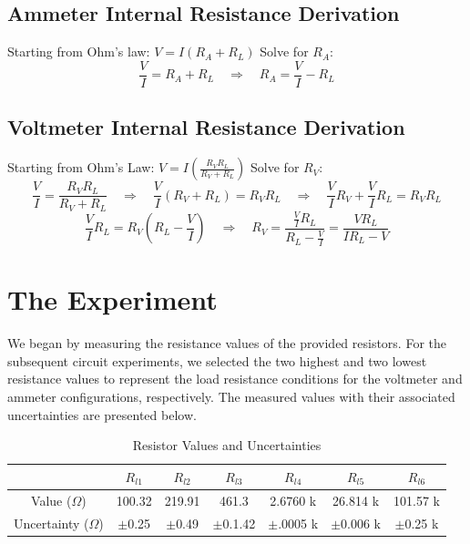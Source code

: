 \documentclass{article} %
\begin{document}
\subsection{Ammeter Internal Resistance Derivation}
Starting from Ohm's law: \( V = I(R_A + R_L) \)
Solve for \( R_A \):
\[
\frac{V}{I} = R_A + R_L \quad\Rightarrow\quad R_A = \frac{V}{I} - R_L
\]

\subsection{Voltmeter Internal Resistance Derivation}
Starting from Ohm's Law: \( V = I\left(\frac{R_V R_L}{R_V + R_L}\right) \)
Solve for \( R_V \):
\[
\frac{V}{I} = \frac{R_V R_L}{R_V + R_L} 
\quad\Rightarrow\quad \frac{V}{I}(R_V + R_L) = R_V R_L 
\quad\Rightarrow\quad \frac{V}{I}R_V + \frac{V}{I}R_L = R_V R_L
\]
\[
\frac{V}{I}R_L = R_V\left(R_L - \frac{V}{I}\right) 
\quad\Rightarrow\quad R_V = \frac{\frac{V}{I}R_L}{R_L - \frac{V}{I}} 
= \frac{V R_L}{I R_L - V}
\]
\section{The Experiment}

We began by measuring the resistance values of the provided resistors. 
For the subsequent circuit experiments, we selected the two highest and two lowest resistance values to represent the load resistance conditions for the voltmeter and ammeter configurations, respectively. 
The measured values with their associated uncertainties are presented below.

\label{table_resistor_values}
\begin{table}[htbp]
\centering
\caption{Resistor Values and Uncertainties}
\begin{tabular}{|c|c|c|c|c|c|c|}
\hline
 & $R_{l1}$ & $R_{l2}$ & $R_{l3}$ & $R_{l4}$ & $R_{l5}$ & $R_{l6}$ \\
\hline
Value ($\Omega$) & 100.32 & 219.91 & 461.3 & 2.6760 k & 26.814 k & 101.57 k \\
\hline
Uncertainty ($\Omega$) & $\pm$0.25 & $\pm$0.49 & $\pm$0.1.42 & $\pm$.0005 k & $\pm$0.006 k & $\pm$0.25 k \\
\hline
\end{tabular}
\end{table}

\newpage
\end{document}
